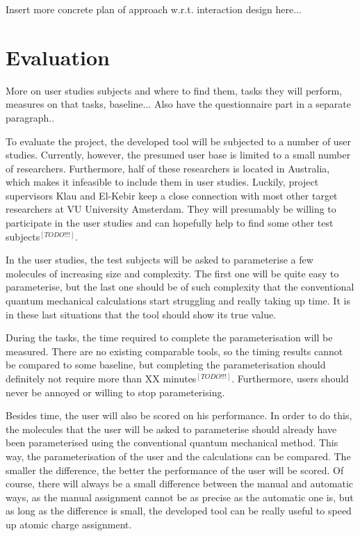 Insert more concrete plan of approach w.r.t. interaction design here...


\section{Evaluation}

More on user studies subjects and where to find them, tasks they will perform, measures on that tasks, baseline... Also have the questionnaire part in a separate paragraph..

To evaluate the project, the developed tool will be subjected to a number of user studies. Currently, however, the presumed user base is limited to a small number of researchers. Furthermore, half of these researchers is located in Australia, which makes it infeasible to include them in user studies. Luckily, project supervisors Klau and El-Kebir keep a close connection with most other target researchers at VU University Amsterdam. They will presumably be willing to participate in the user studies and can hopefully help to find some other test subjects$^{[TODO!!!]}$.

In the user studies, the test subjects will be asked to parameterise a few molecules of increasing size and complexity. The first one will be quite easy to parameterise, but the last one should be of such complexity that the conventional quantum mechanical calculations start struggling and really taking up time. It is in these last situations that the tool should show its true value.

During the tasks, the time required to complete the parameterisation will be measured. There are no existing comparable tools, so the timing results cannot be compared to some baseline, but completing the parameterisation should definitely not require more than XX minutes$^{[TODO!!!]}$. Furthermore, users should never be annoyed or willing to stop parameterising.

Besides time, the user will also be scored on his performance. In order to do this, the molecules that the user will be asked to parameterise should already have been parameterised using the conventional quantum mechanical method. This way, the parameterisation of the user and the calculations can be compared. The smaller the difference, the better the performance of the user will be scored. Of course, there will always be a small difference between the manual and automatic ways, as the manual assignment cannot be as precise as the automatic one is, but as long as the difference is small, the developed tool can be really useful to speed up atomic charge assignment.

